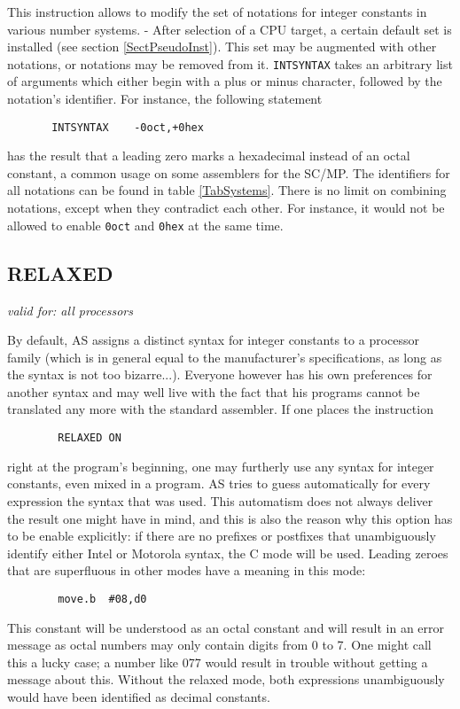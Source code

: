 \documentclass[12pt,twoside]{report}
\makeatletter
\newcommand{\tty}[1]{{\tt #1}}
\newcommand{\ttindex}[1]{\index{#1@{\tt #1}}}
\newcommand{\asname}{{AS}}
\makeatother
\begin{document}
This instruction allows to modify the set of notations for integer constants
in various number systems. - After selection of a CPU target, a certain default
set is installed (see section \ref{SectPseudoInst}).  This set may be augmented
with other notations, or notations may be removed from it.  \tty{INTSYNTAX}
takes an arbitrary list of arguments which either begin with a plus or minus
character, followed by the notation's identifier.  For instance, the following
statement
\begin{verbatim}
       INTSYNTAX    -0oct,+0hex
\end{verbatim}
has the result that a leading zero marks a hexadecimal instead of an octal
constant, a common usage on some assemblers for the SC/MP.  The identifiers
for all notations can be found in table \ref{TabSystems}.  There is no limit on
combining notations, except when they contradict each other.  For instance, it
would not be allowed to enable \tty{0oct} and \tty{0hex} at the same time.


\subsection{RELAXED}
\label{SectRELAXED}
\ttindex{RELAXED}

{\em valid for: all processors}

By default, \asname{} assigns a distinct syntax for integer constants to a
processor family (which is in general equal to the manufacturer's
specifications, as long as the syntax is not too bizarre...).
Everyone however has his own preferences for another syntax and may
well live with the fact that his programs cannot be translated any
more with the standard assembler.  If one places the instruction
\begin{verbatim}
        RELAXED ON
\end{verbatim}
right at the program's beginning, one may furtherly use any syntax
for integer constants, even mixed in a program.  \asname{} tries to guess
automatically for every expression the syntax that was used.  This
automatism does not always deliver the result one might have in mind,
and this is also the reason why this option has to be enable
explicitly: if there are no prefixes or postfixes that unambiguously
identify either Intel or Motorola syntax, the C mode will be used.
Leading zeroes that are superfluous in other modes have a meaning in
this mode:
\begin{verbatim}
        move.b  #08,d0
\end{verbatim}
This constant will be understood as an octal constant and will result
in an error message as octal numbers may only contain digits from 0
to 7.  One might call this a lucky case; a number like 077 would
result in trouble without getting a message about this.  Without the
relaxed mode, both expressions unambiguously would have been
identified as decimal constants.
\end{document}
